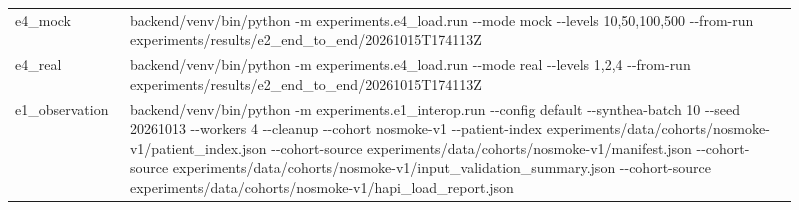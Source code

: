 \begin{longtable}{>{\raggedright\arraybackslash}p{0.12\linewidth}>{\raggedright\arraybackslash}p{0.79\linewidth}}
e4\_\allowbreak{}mock & backend/\allowbreak{}venv/\allowbreak{}bin/\allowbreak{}python -\allowbreak{}m experiments.\allowbreak{}e4\_\allowbreak{}load.\allowbreak{}run -\allowbreak{}-\allowbreak{}mode mock -\allowbreak{}-\allowbreak{}levels 10,50,100,500 -\allowbreak{}-\allowbreak{}from-\allowbreak{}run experiments/\allowbreak{}results/\allowbreak{}e2\_\allowbreak{}end\_\allowbreak{}to\_\allowbreak{}end/\allowbreak{}20261015T174113Z \\
e4\_\allowbreak{}real & backend/\allowbreak{}venv/\allowbreak{}bin/\allowbreak{}python -\allowbreak{}m experiments.\allowbreak{}e4\_\allowbreak{}load.\allowbreak{}run -\allowbreak{}-\allowbreak{}mode real -\allowbreak{}-\allowbreak{}levels 1,2,4 -\allowbreak{}-\allowbreak{}from-\allowbreak{}run experiments/\allowbreak{}results/\allowbreak{}e2\_\allowbreak{}end\_\allowbreak{}to\_\allowbreak{}end/\allowbreak{}20261015T174113Z \\
e1\_\allowbreak{}observation & backend/\allowbreak{}venv/\allowbreak{}bin/\allowbreak{}python -\allowbreak{}m experiments.\allowbreak{}e1\_\allowbreak{}interop.\allowbreak{}run -\allowbreak{}-\allowbreak{}config default -\allowbreak{}-\allowbreak{}synthea-\allowbreak{}batch 10 -\allowbreak{}-\allowbreak{}seed 20261013 -\allowbreak{}-\allowbreak{}workers 4 -\allowbreak{}-\allowbreak{}cleanup -\allowbreak{}-\allowbreak{}cohort nosmoke-\allowbreak{}v1 -\allowbreak{}-\allowbreak{}patient-\allowbreak{}index experiments/\allowbreak{}data/\allowbreak{}cohorts/\allowbreak{}nosmoke-\allowbreak{}v1/\allowbreak{}patient\_\allowbreak{}index.\allowbreak{}json -\allowbreak{}-\allowbreak{}cohort-\allowbreak{}source experiments/\allowbreak{}data/\allowbreak{}cohorts/\allowbreak{}nosmoke-\allowbreak{}v1/\allowbreak{}manifest.\allowbreak{}json -\allowbreak{}-\allowbreak{}cohort-\allowbreak{}source experiments/\allowbreak{}data/\allowbreak{}cohorts/\allowbreak{}nosmoke-\allowbreak{}v1/\allowbreak{}input\_\allowbreak{}validation\_\allowbreak{}summary.\allowbreak{}json -\allowbreak{}-\allowbreak{}cohort-\allowbreak{}source experiments/\allowbreak{}data/\allowbreak{}cohorts/\allowbreak{}nosmoke-\allowbreak{}v1/\allowbreak{}hapi\_\allowbreak{}load\_\allowbreak{}report.\allowbreak{}json \\
\end{longtable}\endgroup
